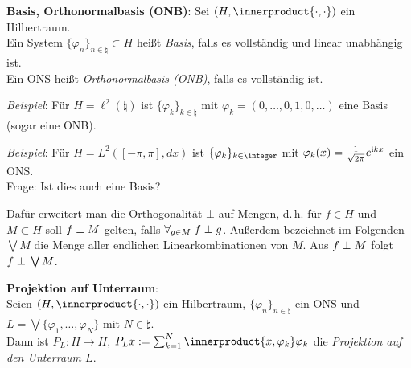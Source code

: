 \textbf{Basis, Orthonormalbasis (ONB)}:
Sei $(H, \innerproduct{\cdot, \cdot})$ ein Hilbertraum.\\
Ein System $\{\varphi_n\}_{n \in \natural} \subset H$ heißt
\emph{Basis}, falls es vollständig und linear unabhängig ist.\\
Ein ONS heißt \emph{Orthonormalbasis (ONB)}, falls es vollständig ist.

\linie

\emph{Beispiel}:
Für $H = \ell^2(\natural)$ ist $\{\varphi_k\}_{k \in \natural}$ mit
$\varphi_k = (0, \dotsc, 0, 1, 0, \dotsc)$ eine Basis (sogar eine ONB).

\emph{Beispiel}:
Für $H = L^2([-\pi, \pi], dx)$ ist $\{\varphi_k\}_{k \in \integer}$ mit
$\varphi_k(x) = \frac{1}{\sqrt{2\pi}} e^{\mathrm{i} kx}$ ein ONS.\\
Frage: Ist dies auch eine Basis?

\linie
\pagebreak

Dafür erweitert man die Orthogonalität $\bot$ auf Mengen, d.\,h.
für $f \in H$ und $M \subset H$ soll $f \;\bot\; M$ gelten, falls
$\forall_{g \in M}\; f \;\bot\; g$.
Außerdem bezeichnet im Folgenden $\bigvee M$ die Menge aller endlichen
Linearkombinationen von $M$.
Aus $f \;\bot\; M$ folgt $f \;\bot\; \bigvee M$.

\textbf{Projektion auf Unterraum}:\\
Seien $(H, \innerproduct{\cdot, \cdot})$ ein Hilbertraum,
$\{\varphi_n\}_{n \in \natural}$ ein ONS und
$L = \bigvee \{\varphi_1, \dotsc, \varphi_N\}$ mit $N \in \natural$.\\
Dann ist $P_L\colon H \rightarrow H$,
$P_L x := \sum_{k=1}^N \innerproduct{x, \varphi_k} \varphi_k$
die \emph{Projektion auf den Unterraum $L$}.

